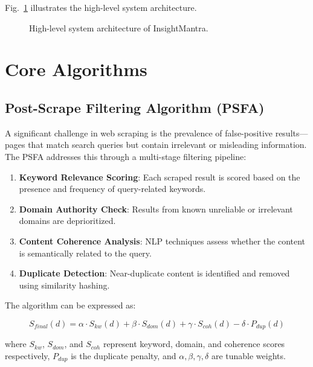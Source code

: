 \documentclass[conference]{IEEEtran}
\begin{document}
Fig.~\ref{fig:architecture} illustrates the high-level system architecture.

\begin{figure}[htbp]
\centerline{}
\caption{High-level system architecture of InsightMantra.}
\label{fig:architecture}
\end{figure}

\section{Core Algorithms}

\subsection{Post-Scrape Filtering Algorithm (PSFA)}
A significant challenge in web scraping is the prevalence of false-positive results---pages that match search queries but contain irrelevant or misleading information. The PSFA addresses this through a multi-stage filtering pipeline:

\begin{enumerate}
    \item \textbf{Keyword Relevance Scoring}: Each scraped result is scored based on the presence and frequency of query-related keywords.
    \item \textbf{Domain Authority Check}: Results from known unreliable or irrelevant domains are deprioritized.
    \item \textbf{Content Coherence Analysis}: NLP techniques assess whether the content is semantically related to the query.
    \item \textbf{Duplicate Detection}: Near-duplicate content is identified and removed using similarity hashing.
\end{enumerate}

The algorithm can be expressed as:

\begin{equation}
S_{final}(d) = \alpha \cdot S_{kw}(d) + \beta \cdot S_{dom}(d) + \gamma \cdot S_{coh}(d) - \delta \cdot P_{dup}(d)
\label{eq:psfa}
\end{equation}

where $S_{kw}$, $S_{dom}$, and $S_{coh}$ represent keyword, domain, and coherence scores respectively, $P_{dup}$ is the duplicate penalty, and $\alpha, \beta, \gamma, \delta$ are tunable weights.
\end{document}
